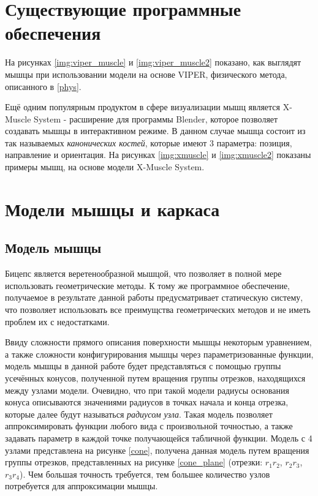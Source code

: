 \section{Существующие программные обеспечения}

На рисунках \ref{img:viper_muscle} и \ref{img:viper_muscle2} показано, как выглядят мышцы при использовании модели на основе VIPER, физического метода, описанного в \ref{phys}.


Ещё одним популярным продуктом в сфере визуализации мышц является X-Muscle System\cite{xms} - расширение для программы Blender\cite{blender}, которое позволяет создавать мышцы в интерактивном режиме. В данном случае мышца состоит из так называемых \textit{канонических костей}, которые имеют 3 параметра: позиция, направление и ориентация. На рисунках \ref{img:xmuscle} и \ref{img:xmuscle2} показаны примеры мышц, на основе модели X-Muscle System.


\section{Модели мышцы и каркаса}

\subsection{Модель мышцы}

Бицепс является веретенообразной мышцой, что позволяет в полной мере использовать геометрические методы. К тому же программное обеспечение, получаемое в результате данной работы предусматривает статическую систему, что позволяет использовать все преимущства геометрических методов и не иметь проблем их с недостатками.

Ввиду сложности прямого описания поверхности мышцы некоторым уравнением, а также сложности конфигурирования мышцы через параметризованные функции, модель мышцы в данной работе будет представляться с помощью группы усечённых конусов, полученной путем вращения группы отрезков, находящихся между узлами модели. Очевидно, что при такой модели радиусы основания конуса описываются значениями радиусов в точках начала и конца отрезка, которые далее будут называться \textit{радиусом узла}. Такая модель позволяет аппроксимировать функции любого вида с произвольной точностью, а также задавать параметр в каждой точке получающейся табличной функции. Модель с 4 узлами представлена на рисунке \ref{cone}, получена данная модель путем вращения группы отрезков, представленных на рисунке \ref{cone_plane} (отрезки: $r_1r_2$, $r_2r_3$, $r_3r_4$). Чем большая точность требуется, тем большее количество узлов потребуется для аппроксимации мышцы.


